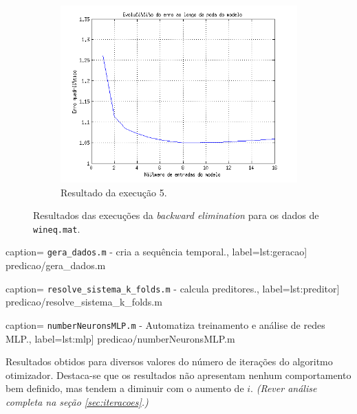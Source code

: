 \begin{figure}[H]
			\begin{subfigure}{.5\textwidth}
				  \centering
				  \includegraphics[width=1\linewidth]{image/backward5_2}
				  \caption{Resultado da execução 5.}
				  \label{backward5_2}
				\end{subfigure}	
			
			\caption{Resultados das execuções da \textit{backward elimination} para os
			dados de \texttt{wineq.mat}.}
			\label{fig:back2}
			\end{figure}
			
		\FloatBarrier
		
		\newpage
		
		 caption={ \texttt{gera\_dados.m} - cria a
		sequência temporal.}, label={lst:geracao}] {predicao/gera_dados.m}
		
		 caption={
		\texttt{resolve\_sistema\_k\_folds.m} - calcula preditores.},
		label={lst:preditor}] {predicao/resolve_sistema_k_folds.m}
		
		 caption={ 
		\texttt{numberNeuronsMLP.m} - Automatiza treinamento e análise de redes MLP.},
		label={lst:mlp}] {predicao/numberNeuronsMLP.m}
		
		\FloatBarrier
		
\newpage

Resultados obtidos para diversos valores do número de iterações do algoritmo
otimizador. Destaca-se que os resultados não apresentam nenhum comportamento bem
definido, mas tendem a diminuir com o aumento de \(i\). \textit{(Rever análise
completa na seção
\ref{sec:iteracoes}.)}
		

